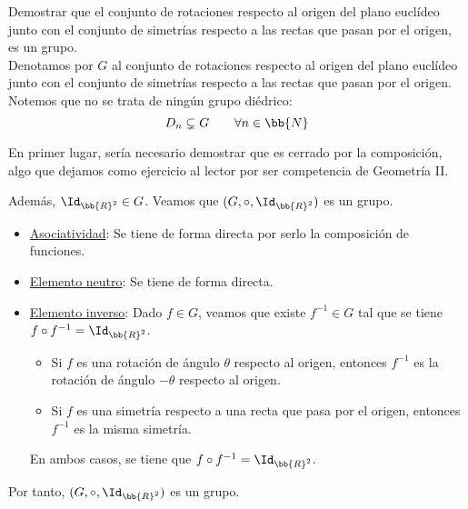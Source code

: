 \begin{ejercicio}\label{ej:2.12}
    Demostrar que el conjunto de rotaciones respecto al origen del plano euclídeo junto con el conjunto de simetrías respecto a las rectas que pasan por el origen, es un grupo.\\

    Denotamos por $G$ al conjunto de rotaciones respecto al origen del plano euclídeo junto con el conjunto de simetrías respecto a las rectas que pasan por el origen. Notemos que no se trata de ningún grupo diédrico:
    \begin{equation*}
        D_n\subsetneq G\qquad \forall n\in\bb{N}
    \end{equation*}

    En primer lugar, sería necesario demostrar que es cerrado por la composición, algo que dejamos como ejercicio al lector por ser competencia de Geometría II.

    Además, $\Id_{\bb{R}^2}\in G$. Veamos que $(G,\circ, \Id_{\bb{R}^2})$ es un grupo.
    \begin{itemize}
        \item \ul{Asociatividad}: Se tiene de forma directa por serlo la composición de funciones.

        \item \ul{Elemento neutro}: Se tiene de forma directa.

        \item \ul{Elemento inverso}: Dado $f\in G$, veamos que existe $f^{-1}\in G$ tal que se tiene $f\circ f^{-1} = \Id_{\bb{R}^2}$.
        \begin{itemize}
            \item Si $f$ es una rotación de ángulo $\theta$ respecto al origen, entonces $f^{-1}$ es la rotación de ángulo $-\theta$ respecto al origen.
            \item Si $f$ es una simetría respecto a una recta que pasa por el origen, entonces $f^{-1}$ es la misma simetría.
        \end{itemize}
        En ambos casos, se tiene que $f\circ f^{-1} = \Id_{\bb{R}^2}$.
    \end{itemize}

    Por tanto, $(G,\circ, \Id_{\bb{R}^2})$ es un grupo.
\end{ejercicio}

